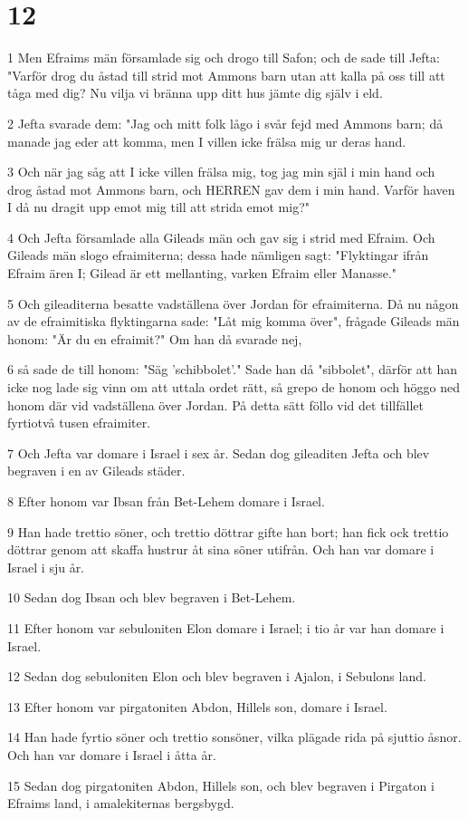\chapter{12}

\par 1 Men Efraims män församlade sig och drogo till Safon; och de sade till Jefta: "Varför drog du åstad till strid mot Ammons barn utan att kalla på oss till att tåga med dig? Nu vilja vi bränna upp ditt hus jämte dig själv i eld.
\par 2 Jefta svarade dem: "Jag och mitt folk lågo i svår fejd med Ammons barn; då manade jag eder att komma, men I villen icke frälsa mig ur deras hand.
\par 3 Och när jag såg att I icke villen frälsa mig, tog jag min själ i min hand och drog åstad mot Ammons barn, och HERREN gav dem i min hand. Varför haven I då nu dragit upp emot mig till att strida emot mig?"
\par 4 Och Jefta församlade alla Gileads män och gav sig i strid med Efraim. Och Gileads män slogo efraimiterna; dessa hade nämligen sagt: "Flyktingar ifrån Efraim ären I; Gilead är ett mellanting, varken Efraim eller Manasse."
\par 5 Och gileaditerna besatte vadställena över Jordan för efraimiterna. Då nu någon av de efraimitiska flyktingarna sade: "Låt mig komma över", frågade Gileads män honom: "Är du en efraimit?" Om han då svarade nej,
\par 6 så sade de till honom: "Säg 'schibbolet'." Sade han då "sibbolet", därför att han icke nog lade sig vinn om att uttala ordet rätt, så grepo de honom och höggo ned honom där vid vadställena över Jordan. På detta sätt föllo vid det tillfället fyrtiotvå tusen efraimiter.
\par 7 Och Jefta var domare i Israel i sex år. Sedan dog gileaditen Jefta och blev begraven i en av Gileads städer.
\par 8 Efter honom var Ibsan från Bet-Lehem domare i Israel.
\par 9 Han hade trettio söner, och trettio döttrar gifte han bort; han fick ock trettio döttrar genom att skaffa hustrur åt sina söner utifrån. Och han var domare i Israel i sju år.
\par 10 Sedan dog Ibsan och blev begraven i Bet-Lehem.
\par 11 Efter honom var sebuloniten Elon domare i Israel; i tio år var han domare i Israel.
\par 12 Sedan dog sebuloniten Elon och blev begraven i Ajalon, i Sebulons land.
\par 13 Efter honom var pirgatoniten Abdon, Hillels son, domare i Israel.
\par 14 Han hade fyrtio söner och trettio sonsöner, vilka plägade rida på sjuttio åsnor. Och han var domare i Israel i åtta år.
\par 15 Sedan dog pirgatoniten Abdon, Hillels son, och blev begraven i Pirgaton i Efraims land, i amalekiternas bergsbygd.

